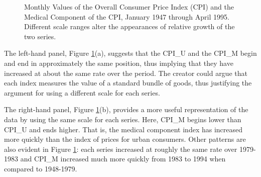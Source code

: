 \begin{figure}[htp]
  \begin{center}  \hfill
    \caption{\label{F21:CPI} \small Monthly Values of the Overall Consumer Price Index (CPI) and the
Medical Component of the CPI, January 1947 through April 1995.
Different scale ranges alter the appearances of relative growth of
the two series.}
  \end{center}
\end{figure}


The left-hand panel, Figure \ref{F21:CPI}(a), suggests that the
CPI\_U and the CPI\_M begin and end in approximately the same
position, thus implying that they have increased at about the same
rate over the period. The creator could argue that each index
measures the value of a standard bundle of goods, thus justifying
the argument for using a different scale for each series.

The right-hand panel, Figure \ref{F21:CPI}(b), provides a more
useful representation of the data by using the same scale for each
series. Here, CPI\_M begins lower than CPI\_U and ends higher. That
is, the medical component index has increased more quickly than the
index of prices for urban consumers. Other patterns are also evident
in Figure \ref{F21:CPI}: each series increased at roughly the same
rate over 1979-1983 and CPI\_M increased much more quickly from 1983
to 1994 when compared to 1948-1979.

